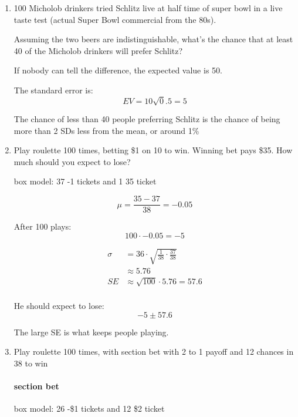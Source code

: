 \documentclass[portrait]{exam}
\begin{document}
  \begin{enumerate}
    \item 100 Micholob drinkers tried Schlitz live at half time of super bowl in
      a live taste test (actual Super Bowl commercial from the 80s). 
      
      Assuming the two beers are indistinguishable, what's the chance that at
      least 40 of the Micholob drinkers will prefer Schlitz?

      \begin{solution}
        If nobody can tell the difference, the expected value is 50.

        The standard error is:
        \[
          EV = 10 \sqrt 0.5 = 5
        \]

        The chance of less than 40 people preferring Schlitz is the chance of
        being more than 2 SDs less from the mean, or around 1\%
      \end{solution}

    \item Play roulette 100 times, betting \$1 on 10 to win. Winning bet
      pays \$35. How much should you expect to lose?
      \begin{solution}
        box model: 37 -1 tickets and 1 35 ticket

        \[
          \mu = \frac{35 - 37}{38} = -0.05
        \]

        After 100 plays:
        \[
          100 \cdot -0.05 = -5
        \]

        \begin{align*}
          \sigma & = 36 \cdot \sqrt{\frac{1}{38} \cdot \frac{37}{38}} \\
                 & \approx 5.76 \\
          SE     & \approx \sqrt{100} \cdot 5.76 = 57.6 \\
        \end{align*}

        He should expect to lose:
        \[
          -5 \pm 57.6
        \]

        The large SE is what keeps people playing.

      \end{solution}

    \item Play roulette 100 times, with section bet with 2 to 1 payoff and 12
      chances in 38 to win

      \begin{solution}
        \paragraph{section bet}
        box model: 26 -\$1 tickets and 12 \$2 ticket


\end{solution}
\end{enumerate}
\end{document}

